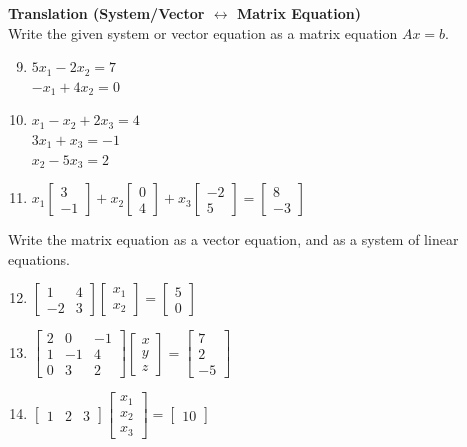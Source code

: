 \documentclass[12pt]{article}
\begin{document}
\textbf{Translation (System/Vector $\leftrightarrow$ Matrix Equation)} \\
Write the given system or vector equation as a matrix equation $Ax=b$.
\begin{enumerate}
\setcounter{enumi}{8}
    \item $5x_1 - 2x_2 = 7$ \\ $-x_1 + 4x_2 = 0$
    \item $x_1 - x_2 + 2x_3 = 4$ \\ $3x_1 + x_3 = -1$ \\ $x_2 - 5x_3 = 2$
    \item $x_1 \begin{bmatrix} 3 \\ -1 \end{bmatrix} + x_2 \begin{bmatrix} 0 \\ 4 \end{bmatrix} + x_3 \begin{bmatrix} -2 \\ 5 \end{bmatrix} = \begin{bmatrix} 8 \\ -3 \end{bmatrix}$
\end{enumerate}

Write the matrix equation as a vector equation, and as a system of linear equations.
\begin{enumerate}
\setcounter{enumi}{11}
    \item $\begin{bmatrix} 1 & 4 \\ -2 & 3 \end{bmatrix} \begin{bmatrix} x_1 \\ x_2 \end{bmatrix} = \begin{bmatrix} 5 \\ 0 \end{bmatrix}$
    \item $\begin{bmatrix} 2 & 0 & -1 \\ 1 & -1 & 4 \\ 0 & 3 & 2 \end{bmatrix} \begin{bmatrix} x \\ y \\ z \end{bmatrix} = \begin{bmatrix} 7 \\ 2 \\ -5 \end{bmatrix}$
    \item $\begin{bmatrix} 1 & 2 & 3 \end{bmatrix} \begin{bmatrix} x_1 \\ x_2 \\ x_3 \end{bmatrix} = \begin{bmatrix} 10 \end{bmatrix}$
\end{enumerate}
\end{document}
